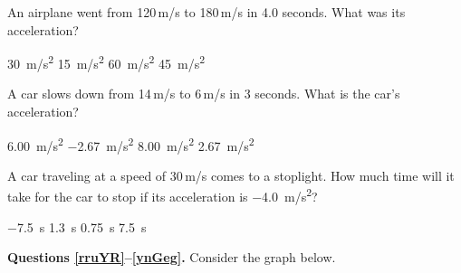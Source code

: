 \documentclass[answers]{exam}
\begin{document}
\begin{questions}

\question
An airplane went from 120\,m/s to 180\,m/s in 4.0 seconds. What was its acceleration?

\begin{randomizechoices}
    \choice \SI{30}{m/s^2}
    \correctchoice \SI{15}{m/s^2}
    \choice \SI{60}{m/s^2}
    \choice \SI{45}{m/s^2}
\end{randomizechoices}

\question
A car slows down from 14\,m/s to 6\,m/s in 3 seconds. What is the car's acceleration?

\begin{randomizechoices}
    \choice \SI{6.00}{m/s^2}
    \correctchoice \SI{-2.67}{m/s^2}
    \choice \SI{8.00}{m/s^2}
    \choice \SI{2.67}{m/s^2}
\end{randomizechoices}

\question
A car traveling at a speed of 30\,m/s comes to a stoplight.  How much time will it take for the car to stop if its
acceleration is \SI{-4.0}{m/s^2}?

\begin{randomizechoices}
    \choice \SI{-7.5}{s}
    \choice \SI{1.3}{s}
    \choice \SI{0.75}{s}
    \correctchoice \SI{7.5}{s}
\end{randomizechoices}

\begin{EnvUplevel}
    \textbf{Questions \ref{rruYR}--\ref{ynGeg}.} Consider the graph below.
\end{EnvUplevel}

\begin{center}
\end{center}


\end{questions}
\end{document}
